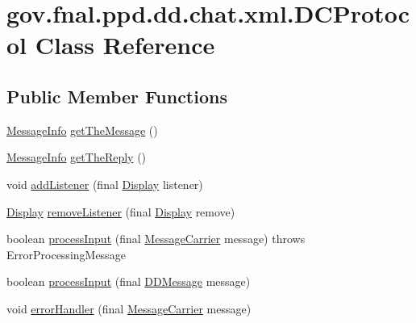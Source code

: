 \hypertarget{classgov_1_1fnal_1_1ppd_1_1dd_1_1chat_1_1xml_1_1DCProtocol}{\section{gov.\-fnal.\-ppd.\-dd.\-chat.\-xml.\-D\-C\-Protocol Class Reference}
\label{classgov_1_1fnal_1_1ppd_1_1dd_1_1chat_1_1xml_1_1DCProtocol}
}
\subsection*{Public Member Functions}
\begin{DoxyCompactItemize}
\item 
\hyperlink{interfacegov_1_1fnal_1_1ppd_1_1dd_1_1chat_1_1xml_1_1MessageInfo}{Message\-Info} \hyperlink{classgov_1_1fnal_1_1ppd_1_1dd_1_1chat_1_1xml_1_1DCProtocol_a313d818c3f5853a5a0d23f37eca48f4c}{get\-The\-Message} ()
\item 
\hyperlink{interfacegov_1_1fnal_1_1ppd_1_1dd_1_1chat_1_1xml_1_1MessageInfo}{Message\-Info} \hyperlink{classgov_1_1fnal_1_1ppd_1_1dd_1_1chat_1_1xml_1_1DCProtocol_a94d5e7e3f46ebd0fe565743cbccc7e63}{get\-The\-Reply} ()
\item 
void \hyperlink{classgov_1_1fnal_1_1ppd_1_1dd_1_1chat_1_1xml_1_1DCProtocol_a5f464e112e31005987bc0bafd41c685f}{add\-Listener} (final \hyperlink{interfacegov_1_1fnal_1_1ppd_1_1dd_1_1signage_1_1Display}{Display} listener)
\item 
\hyperlink{interfacegov_1_1fnal_1_1ppd_1_1dd_1_1signage_1_1Display}{Display} \hyperlink{classgov_1_1fnal_1_1ppd_1_1dd_1_1chat_1_1xml_1_1DCProtocol_aaba06de51ad682fb862602056effb1fe}{remove\-Listener} (final \hyperlink{interfacegov_1_1fnal_1_1ppd_1_1dd_1_1signage_1_1Display}{Display} remove)
\item 
boolean \hyperlink{classgov_1_1fnal_1_1ppd_1_1dd_1_1chat_1_1xml_1_1DCProtocol_a487864fa4d9004c727039aa6601ec8e0}{process\-Input} (final \hyperlink{classgov_1_1fnal_1_1ppd_1_1dd_1_1chat_1_1xml_1_1MessageCarrier}{Message\-Carrier} message)  throws Error\-Processing\-Message 
\item 
boolean \hyperlink{classgov_1_1fnal_1_1ppd_1_1dd_1_1chat_1_1xml_1_1DCProtocol_a542a00996da4ec73a677a3e949fe7b1e}{process\-Input} (final \hyperlink{classgov_1_1fnal_1_1ppd_1_1dd_1_1chat_1_1xml_1_1DDMessage}{D\-D\-Message} message)
\item 
void \hyperlink{classgov_1_1fnal_1_1ppd_1_1dd_1_1chat_1_1xml_1_1DCProtocol_a8e7f875aff53a7ad564c7c11d933abe5}{error\-Handler} (final \hyperlink{classgov_1_1fnal_1_1ppd_1_1dd_1_1chat_1_1xml_1_1MessageCarrier}{Message\-Carrier} message)
\end{DoxyCompactItemize}
